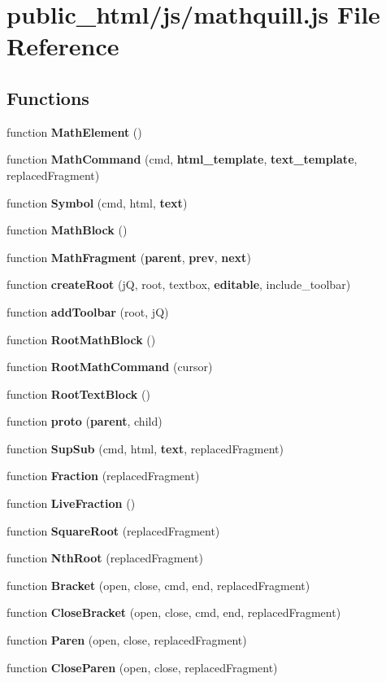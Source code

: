 \section{public\-\_\-html/js/mathquill.js File Reference}
\label{mathquill_8js}
\subsection*{Functions}
\begin{DoxyCompactItemize}
\item 
function {\bf Math\-Element} ()
\item 
function {\bf Math\-Command} (cmd, {\bf html\-\_\-template}, {\bf text\-\_\-template}, replaced\-Fragment)
\item 
function {\bf Symbol} (cmd, html, {\bf text})
\item 
function {\bf Math\-Block} ()
\item 
function {\bf Math\-Fragment} ({\bf parent}, {\bf prev}, {\bf next})
\item 
function {\bf create\-Root} (j\-Q, root, textbox, {\bf editable}, include\-\_\-toolbar)
\item 
function {\bf add\-Toolbar} (root, j\-Q)
\item 
function {\bf Root\-Math\-Block} ()
\item 
function {\bf Root\-Math\-Command} (cursor)
\item 
function {\bf Root\-Text\-Block} ()
\item 
function {\bf proto} ({\bf parent}, child)
\item 
function {\bf Sup\-Sub} (cmd, html, {\bf text}, replaced\-Fragment)
\item 
function {\bf Fraction} (replaced\-Fragment)
\item 
function {\bf Live\-Fraction} ()
\item 
function {\bf Square\-Root} (replaced\-Fragment)
\item 
function {\bf Nth\-Root} (replaced\-Fragment)
\item 
function {\bf Bracket} (open, close, cmd, end, replaced\-Fragment)
\item 
function {\bf Close\-Bracket} (open, close, cmd, end, replaced\-Fragment)
\item 
function {\bf Paren} (open, close, replaced\-Fragment)
\item 
function {\bf Close\-Paren} (open, close, replaced\-Fragment)
\item 

\end{DoxyCompactItemize}
